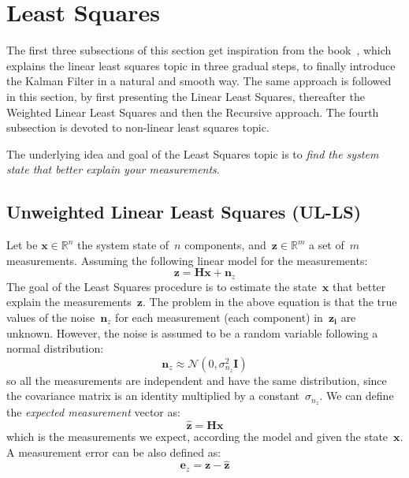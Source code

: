 \section{Least Squares}
The first three subsections of this section get inspiration from the book~\cite{simon06}, which explains the linear least squares topic in three gradual steps, to finally introduce the Kalman Filter in a natural and smooth way. The same approach is followed in this section, by first presenting the Linear Least Squares, thereafter the Weighted Linear Least Squares and then the Recursive approach. The fourth subsection is devoted to non-linear least squares topic.

The underlying idea and goal of the Least Squares topic is to \textit{find the system state that better explain your measurements}.

\subsection{Unweighted Linear Least Squares (UL-LS)}
Let be $\mathbf{x} \in \mathbb{R}^n$ the system state of~$n$ components, and~$\mathbf{z} \in \mathbb{R}^m$ a set of~$m$ measurements. Assuming the following linear model for the measurements:
\begin{equation}
 \mathbf{z} = \mathbf{H}\mathbf{x} + \mathbf{n}_z
\end{equation}
The goal of the Least Squares procedure is to estimate the state~$\mathbf{x}$ that better explain the measurements~$\mathbf{z}$. The problem in the above equation is that the true values of the noise~$\mathbf{n}_z$ for each measurement (each component) in~$\mathbf{z_i}$ are unknown. However, the noise is assumed to be a random variable following a normal distribution:
\begin{equation}
 \mathbf{n}_z \approx \mathcal{N}(0,\sigma^2_{n_z}\mathbf{I})
\end{equation}
so all the measurements are independent and have the same distribution, since the covariance matrix is an identity multiplied by a constant~$\sigma_{n_z}$.
We can define the \textit{expected measurement} vector as:
\begin{equation}
 \hat{\mathbf{z}} = \mathbf{H}\mathbf{x}
\end{equation}
which is the measurements we expect, according the model and given the state~$\mathbf{x}$. A measurement error can be also defined as: 
\begin{equation}
 \mathbf{e}_z = \mathbf{z} - \hat{\mathbf{z}}
\end{equation}
